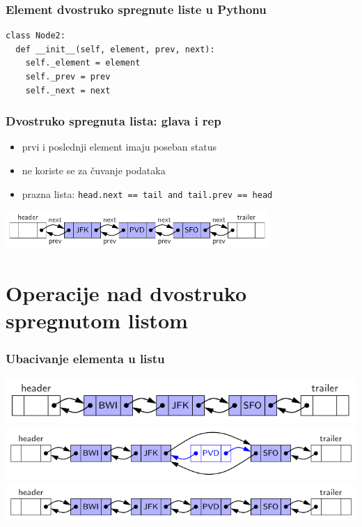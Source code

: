 \documentclass[compress]{beamer}
\begin{document}
\begin{frame}[fragile]
  \frametitle{Element dvostruko spregnute liste u Pythonu}
\begin{verbatim}
class Node2:
  def __init__(self, element, prev, next):
    self._element = element
    self._prev = prev
    self._next = next
\end{verbatim}
\end{frame}

\begin{frame}[fragile]
  \frametitle{Dvostruko spregnuta lista: glava i rep}
  \begin{itemize}
    \item prvi i poslednji element imaju poseban status
    \item ne koriste se za čuvanje podataka
    \item prazna lista: \texttt{head.next == tail and tail.prev == head}
  \end{itemize}
  \begin{center}
    \includegraphics[width=10cm]{asp-07-pic07.pdf}
  \end{center}
\end{frame}

\section[Operacije]{Operacije nad dvostruko spregnutom listom}
\begin{frame}[fragile]
  \frametitle{Ubacivanje elementa u listu}
  \begin{center}
    \includegraphics[scale=0.9]{asp-07-pic08a.pdf} \\
    \includegraphics[scale=0.9]{asp-07-pic08b.pdf} \\
    \includegraphics[scale=0.9]{asp-07-pic08c.pdf}
  \end{center}
\end{frame}
\end{document}
